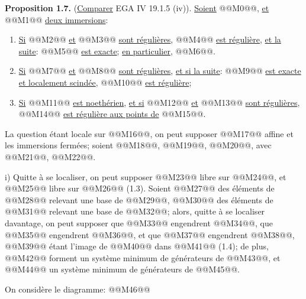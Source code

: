 
\textbf{Proposition 1.7.} (\uline{Comparer} EGA IV 19.1.5 (iv)). \uline{Soient} @@M0@@, \uline{et} @@M1@@ \uline{deux immersions}:
\begin{enumerate}[label=\roman*)]
\item \uline{Si} @@M2@@ \uline{et} @@M3@@ \uline{sont régulières}, @@M4@@ \uline{est régulière}, \uline{et la suite}:
@@M5@@
\uline{est exacte}; \uline{en particulier}, @@M6@@.
\item \uline{Si} @@M7@@ \uline{et} @@M8@@ \uline{sont régulières}, \uline{et si la suite}:
@@M9@@
\uline{est exacte et localement scindée}, @@M10@@ \uline{est régulière};
\item \uline{Si} @@M11@@ \uline{est noethérien}, \uline{et si} @@M12@@ \uline{et} @@M13@@ \uline{sont régulières}, @@M14@@ \uline{est régulière aux points de} @@M15@@.
\end{enumerate}

La question étant locale sur @@M16@@, on peut supposer @@M17@@ affine et les immersions fermées; soient @@M18@@, @@M19@@, @@M20@@, avec @@M21@@, @@M22@@.

i) Quitte à se localiser, on peut supposer @@M23@@ libre sur @@M24@@, et @@M25@@ libre sur @@M26@@ (1.3). Soient @@M27@@ des éléments de @@M28@@ relevant une base de @@M29@@, @@M30@@ des éléments de @@M31@@ relevant une base de @@M32@@; alors, quitte à se localiser davantage, on peut supposer que @@M33@@ engendrent @@M34@@, que @@M35@@ engendrent @@M36@@, et que @@M37@@ engendrent @@M38@@, @@M39@@ étant l'image de @@M40@@ dans @@M41@@ (1.4); de plus, @@M42@@ forment un système minimum de générateurs de @@M43@@, et @@M44@@ un système minimum de générateurs de @@M45@@.

On considère le diagramme:
@@M46@@
